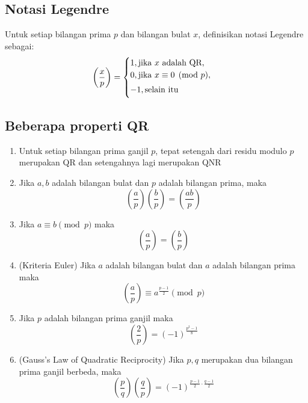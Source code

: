 \documentclass[11pt]{scrartcl}
\begin{document}
\subsection{Notasi Legendre}
Untuk setiap bilangan prima $p$ dan bilangan bulat $x$, definisikan notasi Legendre sebagai:
\[\left(\dfrac{x}{p}\right) = 
\begin{cases}
    1,  \text{jika $x$ adalah QR},\\
    0, \smallskip \text{jika $x \equiv 0 \pmod{p}$},\\
    -1, \smallskip \text{selain itu}
\end{cases}\]
\subsection{Beberapa properti QR}
\begin{enumerate}
    \item Untuk setiap bilangan prima ganjil $p$, tepat setengah dari residu modulo $p$ merupakan QR dan setengahnya lagi merupakan QNR
    \item Jika $a, b$ adalah bilangan bulat dan $p$ adalah bilangan prima, maka \[\left(\dfrac{a}{p}\right)\left(\dfrac{b}{p}\right) = \left(\dfrac{ab}{p}\right)\]
    \item Jika $a \equiv b \pmod{p}$ maka \[\left(\dfrac{a}{p}\right) = \left(\dfrac{b}{p}\right)\]
    \item (Kriteria Euler) Jika $a$ adalah bilangan bulat dan $a$ adalah bilangan prima maka \[\left(\dfrac{a}{p}\right) \equiv a^{\frac{p - 1}{2}} \pmod{p}\]
    \item Jika $p$ adalah bilangan prima ganjil maka \[\left(\dfrac{2}{p}\right) = (-1)^{\frac{p^2 - 1}{8}}\]
    \item (Gauss's Law of Quadratic Reciprocity) Jika $p, q$ merupakan dua bilangan prima ganjil berbeda, maka \[\left(\dfrac{p}{q}\right)\left(\dfrac{q}{p}\right) =  (-1)^{\frac{p - 1}{2} \cdot \frac{q - 1}{2}}\]
\end{enumerate}
\end{document}
